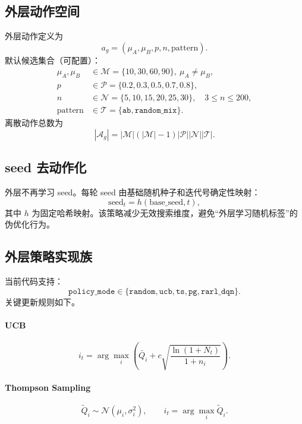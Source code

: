 \documentclass[UTF8,11pt,a4paper]{ctexart}
\begin{document}
\subsection{外层动作空间}
外层动作定义为
\begin{equation}
a_g=(\mu_A,\mu_B,p,n,\mathrm{pattern}).
\end{equation}
默认候选集合（可配置）：
\begin{align}
\mu_A,\mu_B &\in \mathcal{M}=\{10,30,60,90\},\ \mu_A\neq\mu_B, \\
p &\in \mathcal{P}=\{0.2,0.3,0.5,0.7,0.8\}, \\
n &\in \mathcal{N}=\{5,10,15,20,25,30\},\quad 3\le n\le 200, \\
\mathrm{pattern} &\in \mathcal{T}=\{\texttt{ab},\texttt{random\_mix}\}.
\end{align}
离散动作总数为
\begin{equation}
|\mathcal{A}_g| = |\mathcal{M}|(|\mathcal{M}|-1)|\mathcal{P}||\mathcal{N}||\mathcal{T}|.
\end{equation}

\subsection{seed 去动作化}
外层不再学习 seed。每轮 seed 由基础随机种子和迭代号确定性映射：
\begin{equation}
\mathrm{seed}_t = h(\mathrm{base\_seed},t),
\end{equation}
其中 \(h\) 为固定哈希映射。该策略减少无效搜索维度，避免“外层学习随机标签”的伪优化行为。

\subsection{外层策略实现族}
当前代码支持：
\begin{equation}
\texttt{policy\_mode}\in\{\texttt{random},\texttt{ucb},\texttt{ts},\texttt{pg},\texttt{rarl\_dqn}\}.
\end{equation}
关键更新规则如下。
\paragraph{UCB}
\begin{equation}
i_t=\arg\max_i\left(\bar Q_i + c\sqrt{\frac{\ln(1+N_t)}{1+n_i}}\right).
\end{equation}
\paragraph{Thompson Sampling}
\begin{equation}
\tilde Q_i \sim \mathcal{N}(\mu_i,\sigma_i^2),\qquad i_t=\arg\max_i \tilde Q_i.
\end{equation}
\end{document}
